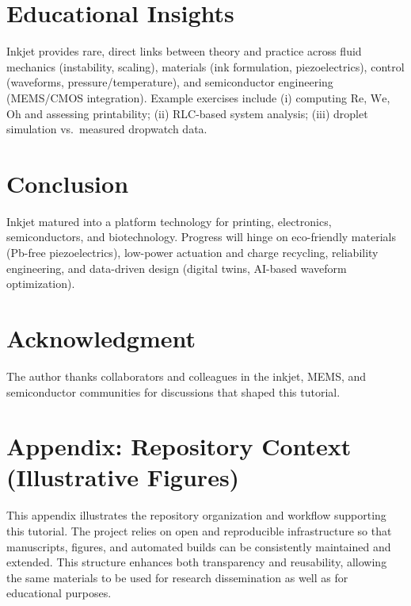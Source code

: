 \documentclass[conference]{IEEEtran}
\newcommand{\Oh}{\mathrm{Oh}}
\newcommand{\We}{\mathrm{We}}
\newcommand{\Rey}{\mathrm{Re}}
\begin{document}
\section{Educational Insights}
Inkjet provides rare, direct links between theory and practice across fluid mechanics (instability, scaling), materials (ink formulation, piezoelectrics), control (waveforms, pressure/temperature), and semiconductor engineering (MEMS/CMOS integration). Example exercises include (i) computing $\Rey$, $\We$, $\Oh$ and assessing printability; (ii) RLC-based system analysis; (iii) droplet simulation vs.\ measured dropwatch data.

\section{Conclusion}
Inkjet matured into a platform technology for printing, electronics, semiconductors, and biotechnology. Progress will hinge on eco-friendly materials (Pb-free piezoelectrics), low-power actuation and charge recycling, reliability engineering, and data-driven design (digital twins, AI-based waveform optimization).

\section*{Acknowledgment}
The author thanks collaborators and colleagues in the inkjet, MEMS, and semiconductor communities for discussions that shaped this tutorial.

\section*{Appendix: Repository Context (Illustrative Figures)}

This appendix illustrates the repository organization and workflow 
supporting this tutorial. The project relies on open and reproducible 
infrastructure so that manuscripts, figures, and automated builds can 
be consistently maintained and extended. This structure enhances both 
transparency and reusability, allowing the same materials to be used for 
research dissemination as well as for educational purposes.
\end{document}
